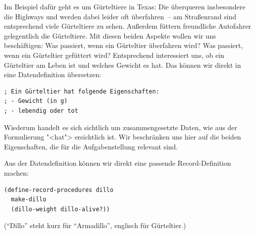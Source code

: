 Im Beispiel dafür geht es um Gürteltiere in Texas:
Die überqueren insbesondere die Highways
und werden dabei leider oft überfahren~-- am Straßenrand
sind entsprechend viele Gürteltiere zu sehen.  Außerdem füttern
freundliche Autofahrer gelegentlich die Gürteltiere.  Mit diesen
beiden Aspekte wollen wir uns beschäftigen: Was passiert, wenn ein
Gürteltier überfahren wird?  Was passiert, wenn ein Gürteltier
gefüttert wird?  Entsprechend interessiert uns, ob ein Gürteltier am
Leben ist und welches Gewicht es hat.  Das können wir direkt in eine
Datendefinition übersetzen:
%
\begin{verbatim}
; Ein Gürteltier hat folgende Eigenschaften:
; - Gewicht (in g)
; - lebendig oder tot
\end{verbatim}
%
Wiederum handelt es sich sichtlich um zusammengesetzte Daten, wie
aus der Formulierung "<hat"> ersichtlich ist.  Wir beschränken uns
hier auf die beiden Eigenschaften, die für die Aufgabenstellung
relevant sind.

Aus der Datendefinition können wir direkt eine passende
Record-Definition machen:
% 
\begin{verbatim}
(define-record-procedures dillo
  make-dillo
  (dillo-weight dillo-alive?))
\end{verbatim}
%
("`Dillo"' steht kurz für "`Armadillo"', englisch für Gürteltier.)

